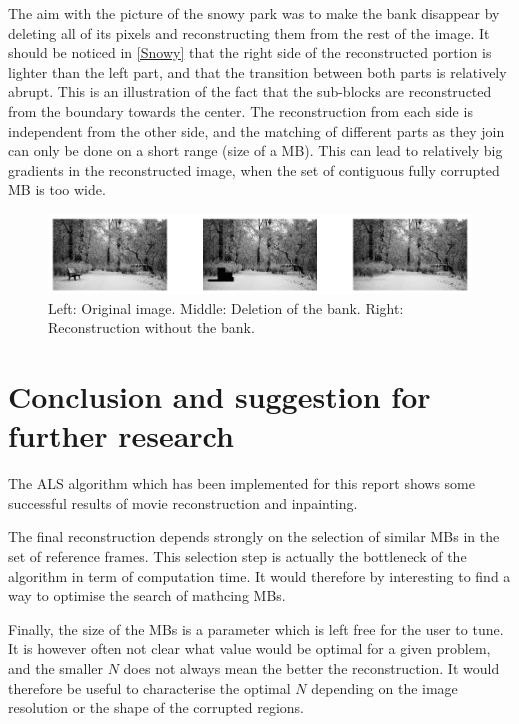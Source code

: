 \documentclass[a4paper, 11pt]{article} %
\begin{document}
The aim with the picture of the snowy park was to make the bank disappear by deleting all of its pixels and reconstructing them from the rest of the image. It should be noticed in \autoref{Snowy} that the right side of the reconstructed portion is lighter than the left part, and that the transition between both parts is relatively abrupt. This is an illustration of the fact that the sub-blocks are reconstructed from the boundary towards the center. The reconstruction from each side is independent from the other side, and the matching of different parts as they join can only be done on a short range (size of a MB). This can lead to relatively big gradients in the reconstructed image, when the set of contiguous fully corrupted MB is too wide.  
\begin{figure}[h!]
\centering
\includegraphics[scale=0.9]{InpaintingSnow}
\caption{Left: Original image. Middle: Deletion of the bank. Right: Reconstruction without the bank.\label{Snowy}}
\end{figure}

\section{Conclusion and suggestion for further research }
The ALS algorithm which has been implemented for this report shows some successful results of movie reconstruction and inpainting.

The final reconstruction depends strongly on the selection of similar MBs in the set of reference frames. This selection step is actually the bottleneck of the algorithm in term of computation time. It would therefore by interesting to find a way to optimise the search of mathcing MBs.
  
Finally, the size of the MBs is a parameter which is left free for the user to tune. It is however often not clear what value would be optimal for a given problem, and the smaller $N$ does not always mean the better the reconstruction. It would therefore be useful to characterise the optimal $N$ depending on the image resolution or the shape of the corrupted regions.
\end{document}
